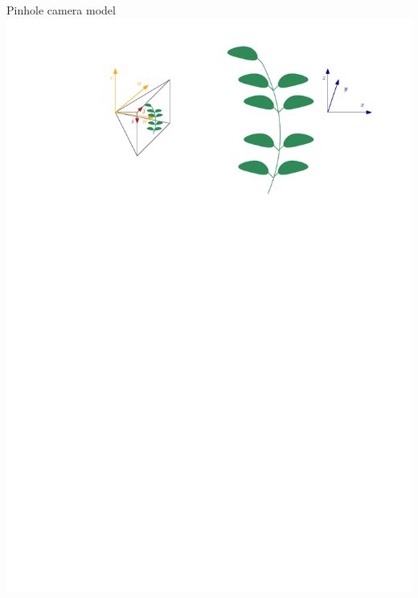 \documentclass[aspectratio=169]{beamer}
\begin{document}
\begin{frame}{Pinhole camera model}
    \centering
    \includegraphics[width=\textwidth]{images/reperes.pdf}
\end{frame}
\end{document}
